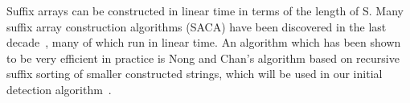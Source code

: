\begin{table}
	\begin{center}
		\hspace{1cm}
		\hspace{1cm}
        \caption{$S=\text{BANANA\$}$}
        \label{table:BANANA}
	\end{center}
\end{table}


Suffix arrays can be constructed in linear time in terms of the length of S. Many suffix
array construction algorithms (SACA) have been discovered in the last
decade~\cite{SuffixArrayConstruction}, many of which run in linear time. An algorithm
which has been shown to be very efficient in practice is Nong and Chan's algorithm based
on recursive suffix sorting of smaller constructed strings, which will be used in our
initial detection algorithm~\cite{LinearTimeSuffixArraySAIS}. 

